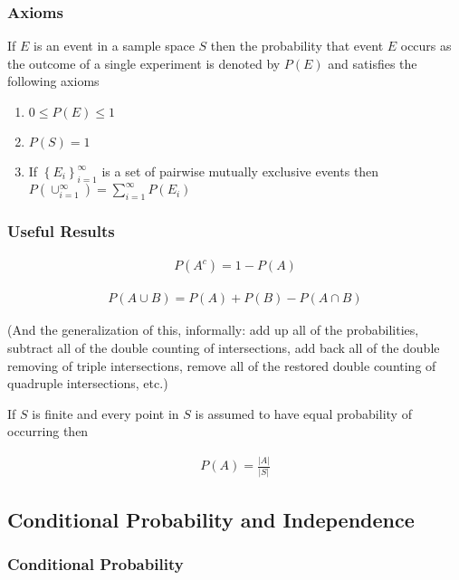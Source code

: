 \documentclass[10pt]{article}
\begin{document}
		\subsubsection*{Axioms}
		
		If $E$ is an event in a sample space $S$ then the probability that event $E$ occurs as the outcome of a single experiment is denoted by $P(E)$ and satisfies the following axioms
		
		\begin{enumerate}
			\item $0 \leq P(E) \leq 1$
			\item $P(S)=1$
			\item If $\left\{ E_i \right\}_{i=1}^\infty$ is a set of pairwise mutually exclusive events then $P(\cup_{i=1}^\infty)=\sum_{i=1}^\infty P(E_i)$
		\end{enumerate}
		
		\subsubsection*{Useful Results}
		
		\begin{align*}
			P(A^c) = 1 - P(A)
		\end{align*}
		
		\begin{align*}
			P(A \cup B) = P(A) + P(B) - P(A \cap B)
		\end{align*}
		
		(And the generalization of this, informally: add up all of the probabilities, subtract all of the double counting of intersections, add back all of the double removing of triple intersections, remove all of the restored double counting of quadruple intersections, etc.)
		
		If $S$ is finite and every point in $S$ is assumed to have equal probability of occurring then
		
		\begin{align*}
			 P(A) = \frac{|A|}{|S|}
		\end{align*}
		
		\subsection{Conditional Probability and Independence}
		
		\subsubsection*{Conditional Probability}
		
\end{document}
